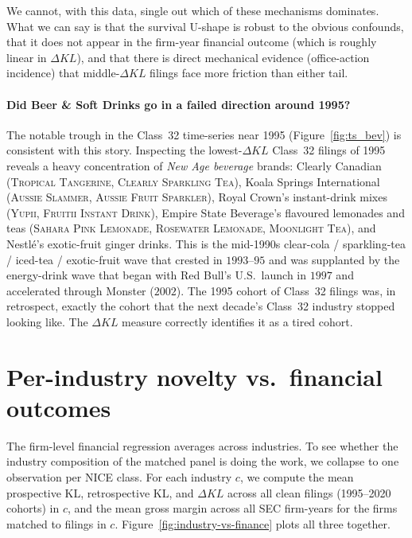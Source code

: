 \documentclass[11pt]{article}
\begin{document}
We cannot, with this data, single out which of these mechanisms
dominates. What we can say is that the survival U-shape is
robust to the obvious confounds, that it does not appear in the
firm-year financial outcome (which is roughly linear in $\Delta
KL$), and that there is direct mechanical evidence
(office-action incidence) that middle-$\Delta KL$ filings face
more friction than either tail.

\paragraph{Did Beer \& Soft Drinks go in a failed direction
around 1995?} The notable trough in the Class~32 time-series
near 1995 (Figure~\ref{fig:ts_bev}) is consistent with this
story. Inspecting the lowest-$\Delta KL$ Class~32 filings of
1995 reveals a heavy concentration of \emph{New Age beverage}
brands: Clearly Canadian (\textsc{Tropical Tangerine},
\textsc{Clearly Sparkling Tea}), Koala Springs International
(\textsc{Aussie Slammer}, \textsc{Aussie Fruit Sparkler}), Royal
Crown's instant-drink mixes (\textsc{Yupii},
\textsc{Fruitii Instant Drink}), Empire State Beverage's
flavoured lemonades and teas (\textsc{Sahara Pink Lemonade},
\textsc{Rosewater Lemonade}, \textsc{Moonlight Tea}), and
Nestl\'e's exotic-fruit ginger drinks. This is the
mid-1990s clear-cola / sparkling-tea / iced-tea / exotic-fruit
wave that crested in $1993$--$95$ and was supplanted by the
energy-drink wave that began with Red Bull's U.S.\ launch in
$1997$ and accelerated through Monster ($2002$). The 1995 cohort
of Class~32 filings was, in retrospect, exactly the cohort that
the next decade's Class~32 industry stopped looking like. The
$\Delta KL$ measure correctly identifies it as a tired cohort.

\section{Per-industry novelty vs.\ financial outcomes}
\label{sec:industry-vs-finance}

The firm-level financial regression averages across industries. To
see whether the industry composition of the matched panel is doing
the work, we collapse to one observation per NICE class. For each
industry $c$, we compute the mean prospective KL, retrospective KL,
and $\Delta KL$ across all clean filings (1995--2020 cohorts) in
$c$, and the mean gross margin across all SEC firm-years for the
firms matched to filings in $c$. Figure~\ref{fig:industry-vs-finance}
plots all three together.
\end{document}
